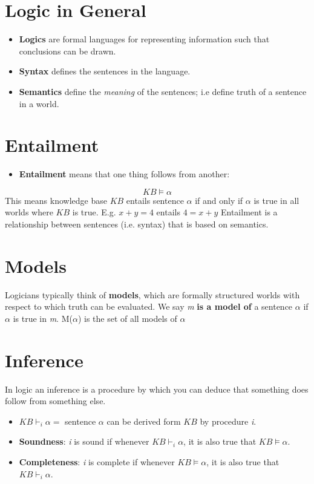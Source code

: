 \documentclass[11pt]{article}
\begin{document}
\section{Logic in General}
\label{sec:org687c359}
\begin{itemize}
\item \textbf{Logics} are formal languages for representing information such that conclusions can be drawn.
\item \textbf{Syntax} defines the sentences in the language.
\item \textbf{Semantics} define the \emph{meaning} of the sentences; i.e define truth of a sentence in a world.
\end{itemize}

\section{Entailment}
\label{sec:org34b83f8}
\begin{itemize}
\item \textbf{Entailment} means that one thing follows from another:
\end{itemize}
\begin{equation}
KB \models \alpha
\end{equation}
This means knowledge base \(KB\) entails sentence \(\alpha\) if and only if \(\alpha\) is true in all worlds where \(KB\) is true.
E.g. \(x + y = 4\) entails \(4 = x + y\)
Entailment is a relationship between sentences (i.e. syntax) that is based on semantics.

\section{Models}
\label{sec:org54e56c1}
Logicians typically think of \textbf{models}, which are formally structured worlds with respect to which truth can be evaluated.
We say \emph{m} \textbf{is a model of} a sentence \(\alpha\) if \(\alpha\) is true in \emph{m}.
M(\(\alpha\)) is the set of all models of \(\alpha\)

\section{Inference}
\label{sec:orgb6ce7cf}
In logic an inference is a procedure by which you can deduce that something does follow from something else.
\begin{itemize}
\item \(KB \vdash_i \alpha =\) sentence \(\alpha\) can be derived form \(KB\) by procedure \emph{i}.
\item \textbf{Soundness}: \emph{i} is sound if whenever \(KB \vdash_i \alpha\), it is also true that \(KB \models \alpha\).
\item \textbf{Completeness}: \emph{i} is complete if whenever \(KB \models \alpha\), it is also true that \(KB \vdash_i \alpha\).
\end{itemize}
\end{document}
